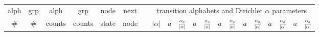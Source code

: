 \documentclass[11pt]{article}
\renewcommand{\baselinestretch}{1.5}
\renewcommand{\baselinestretch}{1.5}
\begin{document}
\renewcommand{\baselinestretch}{1.0}
\begin{table}
\renewcommand{\tabcolsep}{0.7em}
\tiny
\begin{center}
\begin{tabular}{|rr|rr|cc|c|c|cc|cc|cc|cc|cc|cc|} \cline{1-6} \cline{8-20}
\multicolumn{1}{|c}{alph} & \multicolumn{1}{c|}{grp} &
  \multicolumn{1}{c}{alph} & \multicolumn{1}{c|}{grp} & node & next &
  & \multicolumn{13}{|c|}{transition alphabets and Dirichlet $\alpha$ parameters} \\ %
\multicolumn{1}{|c}{\#} & \multicolumn{1}{c|}{\#} & \multicolumn{1}{c}{counts} & \multicolumn{1}{c|}{counts} & state & node & & $|\alpha|$ & $a$ &
  $\frac{\alpha_{a}}{|\alpha|}$ & $a$ & $\frac{\alpha_{a}}{|\alpha|}$ & $a$ &
  $\frac{\alpha_{a}}{|\alpha|}$ & $a$ & $\frac{\alpha_{a}}{|\alpha|}$ & $a$ &
  $\frac{\alpha_{a}}{|\alpha|}$ & $a$ & $\frac{\alpha_{a}}{|\alpha|}$ \\
  \cline{1-6} \cline {8-20} 


\end{tabular}
\end{center}
\end{table}
\end{document}
